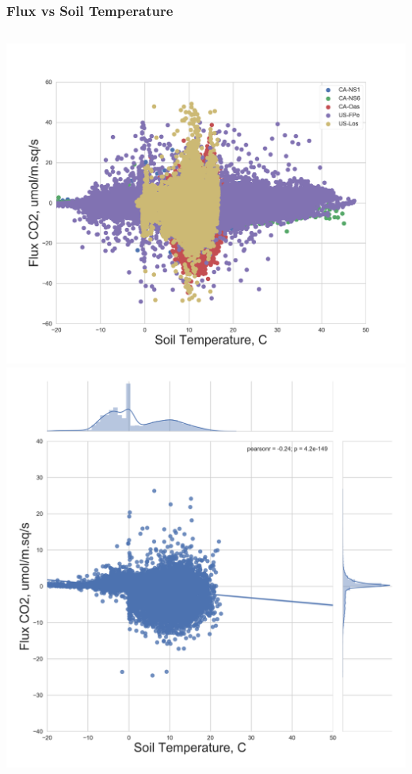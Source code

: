 \documentclass{beamer}
\begin{document}
\begin{frame}
\frametitle{Flux vs Soil Temperature}

\begin{columns}[t]
\centering
\includegraphics[width=\textwidth]{FvsT/all.png}\\
\includegraphics[width=\textwidth]{FvsT/CA-NS1.png}
\centering

\end{columns}
\end{frame}
\end{document}
